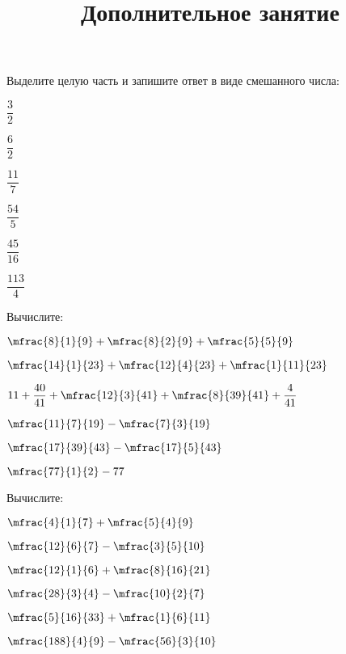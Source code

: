 \begin{listofex}
	\item Выделите целую часть и запишите ответ в виде смешанного числа:
		\begin{enumcols}[itemcolumns=6]
		\item \( \dfrac{3}{2} \)
		\item \( \dfrac{6}{2} \)
		\item \( \dfrac{11}{7} \)
		\item \( \dfrac{54}{5} \)
		\item \( \dfrac{45}{16} \)
		\item \( \dfrac{113}{4} \)
	\end{enumcols}
	\item Вычислите:
		\begin{enumcols}[itemcolumns=3]
		\item \( \mfrac{8}{1}{9}+\mfrac{8}{2}{9}+\mfrac{5}{5}{9} \)
		\item \( \mfrac{14}{1}{23}+\mfrac{12}{4}{23}+\mfrac{1}{11}{23} \)
		\item \( 11+\dfrac{40}{41}+\mfrac{12}{3}{41}+\mfrac{8}{39}{41}+\dfrac{4}{41} \)
		\item \( \mfrac{11}{7}{19}-\mfrac{7}{3}{19} \)
		\item \( \mfrac{17}{39}{43}-\mfrac{17}{5}{43} \)
		\item \( \mfrac{77}{1}{2}-77 \)
	\end{enumcols}
		\item Вычислите:
		\begin{enumcols}[itemcolumns=3]
			\item \( \mfrac{4}{1}{7}+\mfrac{5}{4}{9} \)
			\item \( \mfrac{12}{6}{7}-\mfrac{3}{5}{10} \)
			\item \( \mfrac{12}{1}{6}+\mfrac{8}{16}{21} \)
			\item \( \mfrac{28}{3}{4}-\mfrac{10}{2}{7} \)
			\item \( \mfrac{5}{16}{33}+\mfrac{1}{6}{11} \)
			\item \( \mfrac{188}{4}{9}-\mfrac{56}{3}{10} \)
		\end{enumcols}
\end{listofex}
%	
%	
\newpage
\title{Дополнительное занятие}

